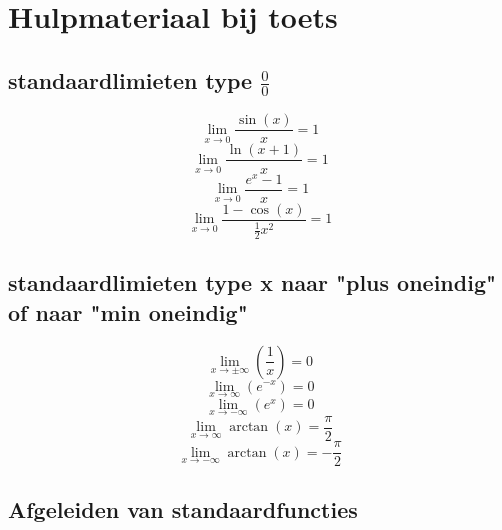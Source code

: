 \documentclass{article}
\begin{document}
\section*{Hulpmateriaal bij toets}
\subsection*{standaardlimieten type $\frac{0}{0}$}
\begin{equation}
\lim_{x\to0}\frac{\sin\left(x\right)}{x}=1
\end{equation}
\begin{equation}
\lim_{x\to0}\frac{\ln\left(x+1\right)}{x}=1
\end{equation}
\begin{equation}
\lim_{x\to0}\frac{e^{x}-1}{x}=1
\end{equation}
\begin{equation}
\lim_{x\to0}\frac{1-\cos\left(x\right)}{\frac{1}{2}x^2}=1
\end{equation}
\subsection*{standaardlimieten type x naar "plus oneindig" of naar "min oneindig"}
\begin{equation}
\lim_{x\to\pm\infty}\left(\frac{1}{x}\right)=0
\end{equation}
\begin{equation}
\lim_{x\to\infty}\left(e^{-x}\right)=0
\end{equation}
\begin{equation}
\lim_{x\to-\infty}\left(e^{x}\right)=0
\end{equation}
\begin{equation}
\lim_{x\to\infty}\arctan\left(x\right)=\frac{\pi}{2}
\end{equation}
\begin{equation}
\lim_{x\to-\infty}\arctan\left(x\right)=-\frac{\pi}{2}
\end{equation}
\subsection*{Afgeleiden van standaardfuncties}
\renewcommand{\arraystretch}{2}
\end{document}
